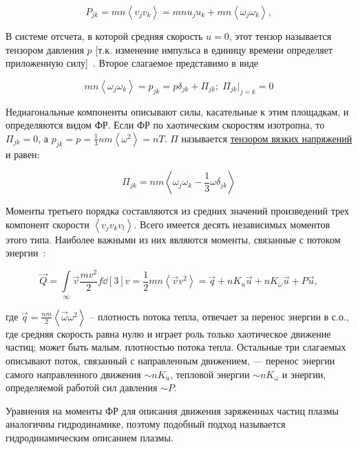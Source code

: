 \documentclass[10pt, a4paper]{article}
\begin{document}
\begin{equation} \label{eq:momentum_flux_density_tensor}
	P_{jk} = mn\left\langle v_jv_k \right\rangle = mnu_ju_k+mn\left\langle \omega_j\omega_k\right\rangle,
\end{equation}

В системе отсчета, в которой средняя скорость $u=0$, этот тензор называется тензором давления $p$ [т.к. изменение импульса в единицу времени определяет приложенную силу]~\cite{golant}. Второе слагаемое представимо в виде

\begin{equation*}
	mn\left\langle \omega_j\omega_k\right\rangle = p_{jk} = p\delta_{jk}+\Pi_{jk};\;\Pi_{jk}\bigg|_{j=k} = 0
\end{equation*}

Недиагональные компоненты описывают силы, касательные к этим площадкам, и определяются видом ФР. Если ФР по хаотическим скоростям изотропна, то $\Pi_{jk} = 0$, а $p_{jk} = p = \frac{1}{3}nm\left\langle\omega^2\right\rangle=nT$. $\Pi$ называется \uline{тензором вязких напряжений} и равен:

\begin{equation*}
		\Pi_{jk} = nm\left\langle \omega_j\omega_k-\frac{1}{3}\omega\delta_{jk}\right\rangle 
\end{equation*}

Моменты третьего порядка составляются из средних значений произведений трех компонент скорости $\left\langle v_jv_kv_l\right\rangle $. Всего имеется десять независимых моментов этого типа. Наиболее важными из них являются моменты, связанные с потоком энергии~\cite{golant}:

\begin{equation} \label{eq:energy_flux}
	\vec{Q}=\int\limits_\infty\vec{v}\frac{mv^2}{2}f\dd[3]{v}=\frac{1}{2}mn\left\langle \vec{v}v^2\right\rangle = \vec{q} + nK_u\vec{u}+nK_\omega\vec{u}+P\vec{u},
\end{equation}

где $\vec{q}=\frac{nm}{2}\left\langle\vec{\omega}\omega^2 \right\rangle $ -- плотность потока тепла, отвечает за перенос энергии в с.о., где средняя скорость равна нулю и играет роль только хаотическое движение частиц; может быть малым. плотностью потока тепла. Остальные три слагаемых описывают поток, связанный с направленным движением, — перенос энергии самого направленного движения $\sim nK_u$, тепловой энергии $\sim nK_\omega$
и энергии, определяемой работой сил давления $\sim P$.

Уравнения на моменты ФР для описания движения заряженных частиц плазмы аналогичны гидродинамике, поэтому подобный подход называется гидродинамическим описанием плазмы. 
\end{document}
